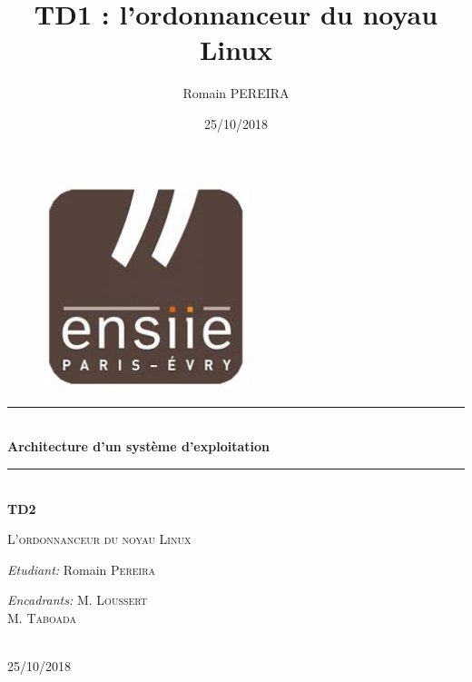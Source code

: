 \documentclass[10pt]{article}
\title{TD1 : l'ordonnanceur du noyau Linux}
\author{Romain PEREIRA}
\date{25/10/2018}
\newcommand{\HRule}{\rule{\linewidth}{0.5mm}}
\begin{document}
    
    \begin{titlepage}
        \begin{sffamily}
            \begin{center}

                \begin{figure}[h!]
                    \includegraphics[width=6cm]{ensiie.jpeg}
                \end{figure}

                \HRule \\[0.4cm]
                { \huge \bfseries Architecture d'un système d'exploitation\\[0.4cm] }
                \HRule \\[2.0cm]
                
                { \huge \bfseries TD2\\[0.5cm] }

                \textsc{\Large L'ordonnanceur du noyau Linux}\\[2.0cm]

                \vfill
                \begin{minipage}{0.4\textwidth}
                    \begin{flushleft} \large
                        \emph{Etudiant:} Romain \textsc{Pereira}\\
                    \end{flushleft}
                \end{minipage}
                \begin{minipage}{0.4\textwidth}
                    \begin{flushright} \large
                        \emph{Encadrants:}  M. \textsc{Loussert}\\
                                            M. \textsc{Taboada}
                    \end{flushright}
                \end{minipage}
                \\[2.0cm]
                {\large 25/10/2018}
            \end{center}
        \end{sffamily}
    \end{titlepage}
    
\end{document}
